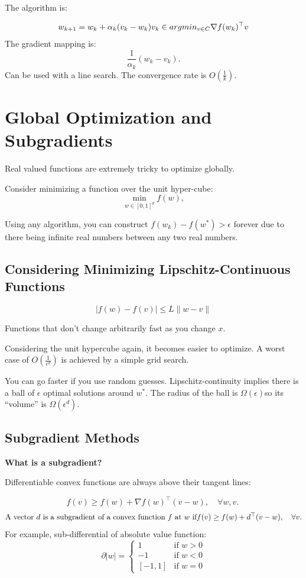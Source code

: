 \documentclass[
]{article}
\begin{document}
The algorithm is:

\[
w_{k+1} = w_k + \alpha_k (v_k - w_k)\\
v_k \in argmin_{v \in C} \nabla f(w_k)^\top v\\
\]
The gradient mapping is:
\[
\frac{1}{\alpha_k} (w_k - v_k).
\]
Can be used with a line search. The convergence rate is \(O(\frac{1}{k})\).

\section{Global Optimization and Subgradients}\label{global-optimization-and-subgradients}

Real valued functions are extremely tricky to optimize globally.

Consider minimizing a function over the unit hyper-cube:
\[
\min_{w \in [0,1]^d} f(w),
\]

Using any algorithm, you can construct \(f(w_k) - f(w^*) > \epsilon\) forever due to there being infinite real numbers between any two real numbers.

\subsection{Considering Minimizing Lipschitz-Continuous Functions}\label{considering-minimizing-lipschitz-continuous-functions}

\[
\vert f(w) - f(v) \vert \leq L \lVert w - v \rVert
\]

Functions that don't change arbitrarily fast as you change \(x\).

Considering the unit hypercube again, it becomes easier to optimize. A worst case of \(O(\frac{1}{\epsilon^d})\) is achieved by a simple grid search.

You can go faster if you use random guesses. Lipschitz-continuity implies there is a ball of \(\epsilon\) optimal solutions around \(w^*\). The radius of the ball is \(\Omega(\epsilon)\)so its ``volume'' is \(\Omega(\epsilon^d)\).

\subsection{Subgradient Methods}\label{subgradient-methods}

\textbf{What is a subgradient?}

Differentiable convex functions are always above their tangent lines:

\[
f(v) \geq f(w) + \nabla f(w)^\top (v - w), \quad \forall w, v.
\
\]
\[
\text{A vector } d \text{ is a subgradient of a convex function } f \text{ at } w \text{ if}\\
f(v) \geq f(w) + d^\top (v - w), \quad \forall v.
\]
For example, sub-differential of absolute value function:
\[
\partial |w| =
\begin{cases}
1 & \text{if } w > 0 \\
-1 & \text{if } w < 0 \\
[-1, 1] & \text{if } w = 0
\end{cases}
\]
\end{document}
